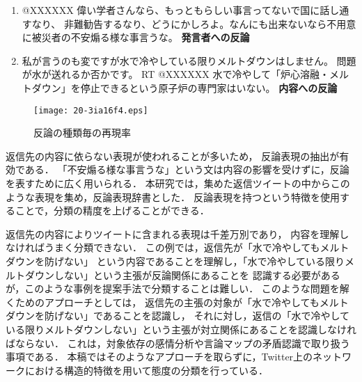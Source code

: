 \documentclass[japanese]{jnlp_1.4}
\newcommand{\addspan}[1]{}
\begin{document}
\begin{enumerate}
 \item @XXXXXX 偉い学者さんなら、もっともらしい事言ってないで国に話し通すなり、
 非難勧告するなり、どうにかしろよ。なんにも出来ないなら不用意に被災者の不安煽る様な事言うな。 \textbf{発言者への反論}
 \item 私が言うのも変ですが水で冷やしている限りメルトダウンはしません。
 問題が水が送れるか否かです。 RT @XXXXXX 水で冷やして「炉心溶融・メルトダウン」を停止できるという原子炉の専門家はいない。 \textbf{内容への反論}
 \addspan{
 \item @XXXXXX 防護ケース（格納容器のことか？）が万が一破裂しても圧力容器があるので、即炉心が外界に露出ということではない。誤解を生むRTは控えて、RT元は吟味していただきたい。 \textbf{複合的な反論}
 }
\end{enumerate}

\addspan{
データセットBに含まれる263個の反論のうち，発言者への反論が81個，内容への反論が137個，複合的な反論が45個であった．
それぞれの反論についてどの程度識別することができたのかを評価するため，
図\ref{fig:使用する素性による性能変化}における各特徴を使用した時毎の再現率を図\ref{fig:反論種類毎の性能}に示す．
}

\begin{figure}[b]
  \begin{center}
   \texttt{[image: 20-3ia16f4.eps]}
  \end{center}
  \caption{反論の種類毎の再現率}
  \label{fig:反論種類毎の性能}
\end{figure}

\addspan{発言者への反論については，}返信先の内容に依らない表現が使われることが多いため，
反論表現の抽出が有効である．
\addspan{上記（1）の例では，}「不安煽る様な事言うな」という文は内容の影響を受けずに，反論を表すために広く用いられる．
本研究では，集めた返信ツイートの中からこのような表現を集め，反論表現辞書とした．
反論表現を持つという特徴を使用することで，分類の精度を上げることができる．
\addspan{このことは，図\ref{fig:反論種類毎の性能}において，反論表現を使用した際に再現率が大きく上昇していることから分かる．}

\addspan{次に，内容への反論については，}返信先の内容によりツイートに含まれる表現は千差万別であり，
内容を理解しなければうまく分類できない．
この例では，返信先が「水で冷やしてもメルトダウンを防げない」
という内容であることを理解し，「水で冷やしている限りメルトダウンしない」という主張が反論関係にあることを
認識する必要があるが，このような事例を提案手法で分類することは難しい．
このような問題を解くためのアプローチとしては，
返信先の主張の対象が「水で冷やしてもメルトダウンを防げない」であることを認識し，
それに対し，返信の「水で冷やしている限りメルトダウンしない」という主張が対立関係にあることを認識しなければならない．
これは，対象依存の感情分析\cite{Jiang_2011}や言論マップ\cite{水野_2011}の矛盾認識で取り扱う事項である．
本稿ではそのようなアプローチを取らずに，Twitter上のネットワークにおける構造的特徴を用いて態度の分類を行っている．
\addspan{
図\ref{fig:反論種類毎の性能}からは，構造的特徴の利用により，内容への反論の識別数が若干向上していることが読みとれるが，
十分な改善とは言えずさらなる検討が必要である．
}
\end{document}
